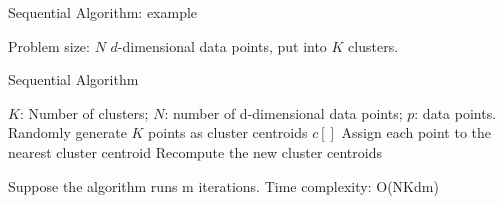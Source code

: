 \documentclass[
nopagebreaks,
style=klope,
fleqn]{powerdot}
\begin{document}
\begin{slide} {Sequential Algorithm: example}
\begin{figure}[h]
  \end{figure}
  \begin{compactitem}
  \item{Problem size: $N$ $d$-dimensional data points, put into $K$ clusters.}
  \end{compactitem}
\end{slide}

\begin{slide} {Sequential Algorithm}
  \begin{algorithmic}[1]
    \INPUT $K$: Number of clusters; $N$: number of d-dimensional data points; $p$: data points. 
    \State Randomly generate $K$ points as cluster centroids $c[]$
    \State Assign each point to the nearest cluster centroid
    \State Recompute the new cluster centroids
    \EndWhile
    \EndFunction
  \end{algorithmic}
  \begin{compactitem}
    \vspace{.5in}
    \item{Suppose the algorithm runs m iterations. Time complexity: O(NKdm)}
  \end{compactitem}
\end{slide}
\end{document}
